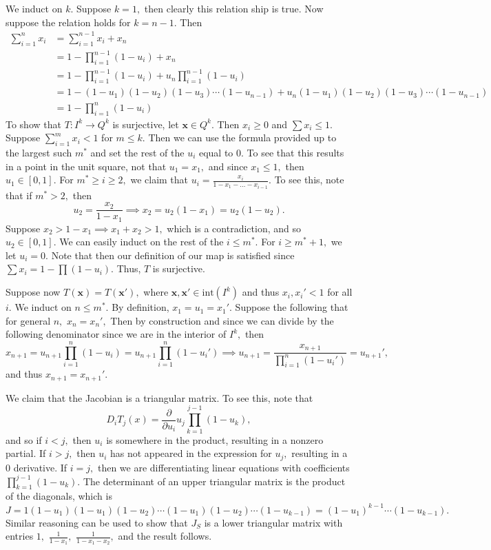 \documentclass[11pt]{article}
\begin{document}
\begin{solution}
We induct on $k.$ Suppose $k = 1,$ then clearly this relation ship is true. Now suppose the relation holds for $k = n-1.$ Then 
\begin{align*}
    \sum_{i=1}^n x_i &= \sum_{i=1}^{n-1}x_i + x_n\\
    &= 1 - \prod_{i=1}^{n-1}(1-u_i) + x_n\\
    &= 1 - \prod_{i=1}^{n-1}(1-u_i) + u_n\prod_{i=1}^{n-1} (1-u_i)\\
    &= 1- (1-u_1)(1-u_2)(1-u_3)\cdots(1-u_{n-1}) + u_n(1-u_1)(1-u_2)(1-u_3)\cdots(1-u_{n-1})\\
    &= 1 - \prod_{i=1}^n (1-u_i)
\end{align*}
To show that $T: I^k \to Q^k$ is surjective, let $\textbf{x}\in Q^k.$ Then $x_i \geq 0$ and $\sum x_i \leq 1.$  Suppose $\sum_{i=1}^m x_i < 1$ for $m \leq k.$ Then we can use the formula provided up to the largest such $m^*$ and set the rest of the $u_i$ equal to $0.$ To see that this results in a point in the unit square, not that $u_1 = x_1,$ and since $x_1 \leq 1,$ then $u_1 \in [0,1].$ For $m^* \geq i \geq 2,$ we claim that $u_i = \frac{x_i}{1 - x_1 - \dots- x_{i-1}}.$ To see this, note that if $m^* >2,$ then \[u_2 = \frac{x_2}{1 - x_1}\implies x_2 = u_2 (1 - x_1) = u_2 (1-u_2).\] Suppose $x_2 >1-x_1 \implies x_1 +x_2 >1,$ which is a contradiction, and so $u_2 \in [0,1].$ We can easily induct on the rest of the $i\leq m^*.$ For $i\geq m^*+1,$ we let $u_i = 0.$ Note that then our definition of our map is satisfied since $\sum x_i = 1 - \prod (1-u_i).$ Thus, $T$ is surjective.

Suppose now $T(\textbf{x}) = T(\textbf{x}'),$ where $\textbf{x},\textbf{x}' \in \text{int}(I^k)$ and thus $x_i, x_i' < 1$ for all $i.$ We induct on $n\leq m^*.$ By definition, $x_1 = u_1 = x_1'.$  Suppose the following that for general $n,$ $x_n = x_n',$ 
Then by construction and since we can divide by the following denominator since we are in the interior of $I^k,$ then
\[x_{n+1} = u_{n+1}\prod_{i=1}^n (1-u_i) = u_{n+1}\prod_{i=1}^n (1-u_i') \implies u_{n+1} = \frac{x_{n+1}}{\prod_{i=1}^n (1-u_i')} = u_{n+1}',\] and thus $x_{n+1} = x_{n+1}'.$

We claim that the Jacobian is a triangular matrix. To see this, note that 
\[D_iT_j(x) = \frac{\partial}{\partial u_i} u_j \prod_{k=1}^{j-1}(1-u_k),\] and so if $i < j,$ then $u_i$ is somewhere in the product, resulting in a nonzero partial. If $i>j,$ then $u_i$ has not appeared in the expression for $u_j,$ resulting in a $0$ derivative. If $i = j,$ then we are differentiating linear equations with coefficients $\prod_{k=1}^{j-1} (1-u_k).$ The determinant of an upper triangular matrix is the product of the diagonals, which is 
\[J = 1(1-u_1)(1-u_1)(1-u_2)\cdots (1-u_1)(1-u_2)\cdots (1-u_{k-1}) = (1-u_1)^{k-1}\cdots (1-u_{k-1}).\] Similar reasoning can be used to show that $J_S$ is a lower triangular matrix with entries $1,$ $\frac{1}{1-x_1},$ $\frac{1}{1-x_1 - x_2},$ and the result follows.
\end{solution}
\end{document}
